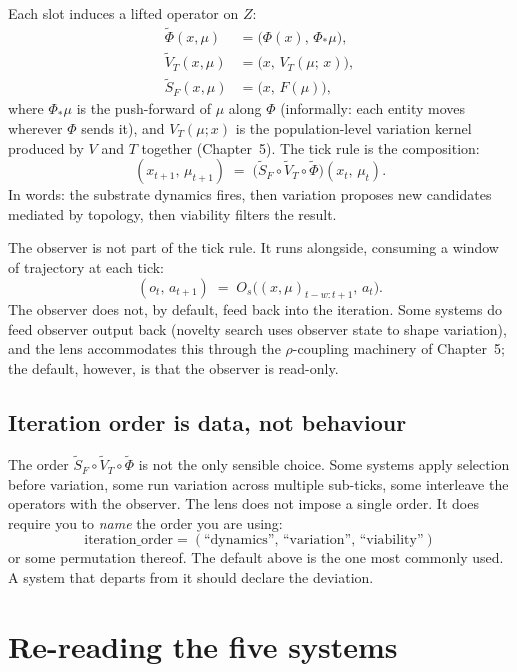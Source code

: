 Each slot induces a lifted operator on $Z$:
\begin{align*}
  \widetilde\Phi(x,\mu)   &= \big(\Phi(x),\, \Phi_*\mu\big), \\
  \widetilde V_T(x,\mu)   &= \big(x,\, V_T(\mu;\, x)\big), \\
  \widetilde S_F(x,\mu)   &= \big(x,\, F(\mu)\big),
\end{align*}
where $\Phi_*\mu$ is the push-forward of $\mu$ along $\Phi$ (informally:
each entity moves wherever $\Phi$ sends it), and $V_T(\mu; x)$ is the
population-level variation kernel produced by $V$ and $T$ together
(Chapter~5). The tick rule is the composition:
\[
  (x_{t+1},\, \mu_{t+1}) \;=\;
  \big(\widetilde S_F \circ \widetilde V_T \circ \widetilde\Phi\big)
  (x_t,\, \mu_t).
\]
In words: the substrate dynamics fires, then variation proposes new
candidates mediated by topology, then viability filters the result.

The observer is not part of the tick rule. It runs alongside, consuming
a window of trajectory at each tick:
\[
  (o_t,\, a_{t+1}) \;=\; O_s\big((x,\mu)_{t-w:t+1},\, a_t\big).
\]
The observer does not, by default, feed back into the iteration. Some
systems do feed observer output back (novelty search uses observer
state to shape variation), and the lens accommodates this through the
$\rho$-coupling machinery of Chapter~5; the default, however, is that
the observer is read-only.

\subsection*{Iteration order is data, not behaviour}

The order $\widetilde S_F \circ \widetilde V_T \circ \widetilde\Phi$ is
not the only sensible choice. Some systems apply selection before
variation, some run variation across multiple sub-ticks, some interleave
the operators with the observer. The lens does not impose a single
order. It does require you to \emph{name} the order you are using:
\[
  \text{iteration\_order}
  = (\text{``dynamics''},\, \text{``variation''},\, \text{``viability''})
\]
or some permutation thereof. The default above is the one most commonly
used. A system that departs from it should declare the deviation.

\section{Re-reading the five systems}


